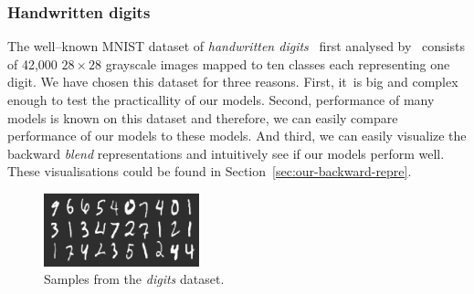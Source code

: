 \subsubsection{Handwritten digits} 
\label{sec:datasets-digits} 

The well--known MNIST dataset of \emph{handwritten digits}~\citep{digits2014mnist} first analysed by~\citet{lecun1998gradient} consists of 42,000 $28 \times 28$ grayscale images mapped to ten classes each representing one digit. We have chosen this dataset for three reasons. First, it~is big and complex enough to test the practicallity of our models. Second, performance of many models is known on this dataset and therefore, we can easily compare performance of our models to these models. And third, we can easily visualize the backward \emph{blend} representations and intuitively see if our models perform well. These visualisations could be found in Section~\ref{sec:our-backward-repre}. 

\begin{figure}[H]
  \centering
  \includegraphics[width=0.4\textwidth]{img/digits.png} 
  \caption{Samples from the \emph{digits} dataset.}
  \label{fig:datasets-digits}
\end{figure}


